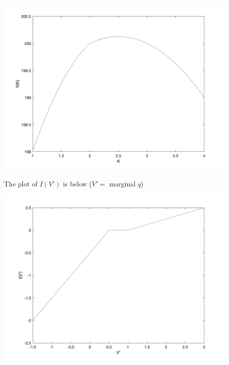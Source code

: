 \documentclass[10pt,letter]{article}
\begin{document}
\begin{center}
\includegraphics[width=12cm]{ps2fig2}
\end{center}

The plot of $I(V')$ is below ($V' =$ marginal $q$)

\begin{center}
\includegraphics[width=12cm]{ps2fig3}
\end{center}
\end{document}
